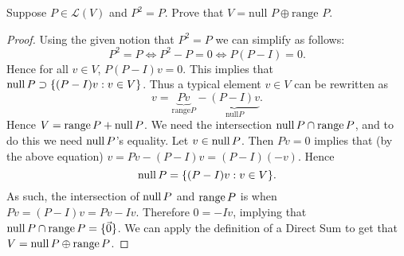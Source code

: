Suppose $P \in \mathcal{L}(V)$ and $P^2=P$.  Prove that $V = \text{null }P \oplus \text{range } P$.
\begin{mybox}
    \begin{proof}
        Using the given notion that $P^2 = P$ we can simplify as follows:
            $$
                  P^2 = P
                \iff P^2 - P = 0
                \iff  P(P-I) = 0.$$
            Hence for all $v \in V$, $P(P-I)v = 0$. This implies that \\$\operatorname{null}{P} \supset \{(P-I)v : v \in V\}$. Thus a typical element $v \in V$ can be rewritten as
            $$v = \underbrace{Pv}_{\text{range}P} - \underbrace{(P-I)v}_{\text{null}P}.$$
            Hence $V = \operatorname{range}{P} + \operatorname{null}{P}$. We need the intersection $\operatorname{null}{P} \cap \operatorname{range}{P}$, and to do this we need $\operatorname{null}{P}$'s equality. Let $v \in \operatorname{null}{P}$. Then $Pv = 0$ implies that (by the above equation) $v = Pv - (P-I)v = (P-I)(-v)$. Hence $$\operatorname{null}{P} = \{(P-I)v : v \in V\}.$$
            As such, the intersection of $\operatorname{null}{P}$ and $\operatorname{range}{P}$ is when $Pv = (P-I)v = Pv - Iv$. Therefore $0 = -Iv$, implying that $\operatorname{null}{P} \cap \operatorname{range}{P} = \{\vec{0}\}$. We can apply the definition of a Direct Sum to get that $V = \operatorname{null}{P} \oplus \operatorname{range}{P}$.
    \end{proof}
\end{mybox}